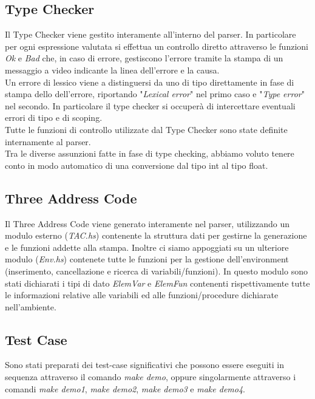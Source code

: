 \documentclass[12pt]{article}
\begin{document}
\subsection{Type Checker}
Il Type Checker viene gestito interamente all'interno del parser. In particolare per ogni espressione valutata si effettua un controllo diretto attraverso le funzioni \textit{Ok} e \textit{Bad} che, in caso di errore, gestiscono l'errore tramite la stampa di un messaggio a video indicante la linea dell'errore e la causa.\\
Un errore di lessico viene a distinguersi da uno di tipo direttamente in fase di stampa dello dell'errore, riportando "\textit{Lexical error}" nel primo caso e "\textit{Type error}" nel secondo. In particolare il type checker si occuperà di intercettare eventuali errori di tipo e di scoping.\\
Tutte le funzioni di controllo utilizzate dal Type Checker sono state definite internamente al parser.\\
Tra le diverse assunzioni fatte in fase di type checking, abbiamo voluto tenere conto in modo automatico di una conversione dal tipo int al tipo float.

\subsection{Three Address Code}
Il Three Address Code viene generato interamente nel parser, utilizzando un modulo esterno (\textit{TAC.hs}) contenente la struttura dati per gestirne la generazione e le funzioni addette alla stampa. Inoltre ci siamo appoggiati su un ulteriore modulo (\textit{Env.hs}) contenete tutte le funzioni per la gestione dell'environment (inserimento, cancellazione e ricerca di variabili/funzioni).
In questo modulo sono stati dichiarati i tipi di dato \textit{ElemVar} e \textit{ElemFun} contenenti rispettivamente tutte le informazioni relative alle variabili ed alle funzioni/procedure dichiarate nell'ambiente.

\subsection{Test Case}
Sono stati preparati dei test-case significativi che possono essere eseguiti in sequenza attraverso il comando \textit{make demo}, oppure singolarmente attraverso i comandi \textit{make demo1}, \textit{make demo2}, \textit{make demo3} e \textit{make demo4}.
\end{document}

